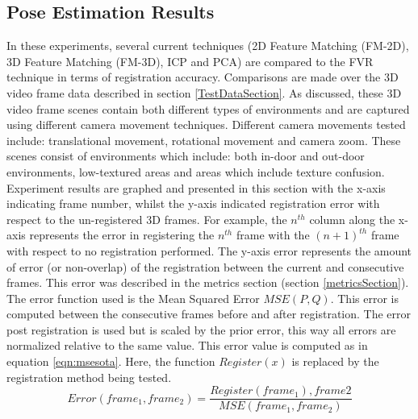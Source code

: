 
\subsection{Pose Estimation Results}

In these experiments, several current techniques (2D Feature Matching (FM-2D), 3D Feature Matching (FM-3D), ICP and PCA) are compared to the FVR technique in terms of registration accuracy. Comparisons are made over the 3D video frame data described in section \ref{TestDataSection}. As discussed, these 3D video frame scenes contain both different types of environments and are captured using different camera movement techniques. Different camera movements tested include: translational movement, rotational movement and camera zoom. These scenes consist of environments which include: both in-door and out-door environments, low-textured areas and areas which include texture confusion. \\

Experiment results are graphed and presented in this section with the x-axis indicating frame number, whilst the y-axis indicated registration error with respect to the un-registered 3D frames. For example, the $n^{th}$ column along the x-axis represents the error in registering the $n^{th}$ frame with the $(n+1)^{th}$ frame with respect to no registration performed. The y-axis error represents the amount of error (or non-overlap) of the registration between the current and consecutive frames. This error was described in the metrics section (section \ref{metricsSection}). The error function used is the Mean Squared Error $MSE(P,Q)$. This error is computed between the consecutive frames before and after registration. The error post registration is used but is scaled by the prior error, this way all errors are normalized relative to the same value. This error value is computed as in equation \ref{eqn:msesota}. Here, the function $Register(x)$ is replaced by the registration method being tested. \\

\begin{equation} \label{eqn:msesota}
Error(frame_1, frame_2) =  \frac{Register(frame_1), frame2}{MSE(frame_1,frame_2)}
\end{equation}


